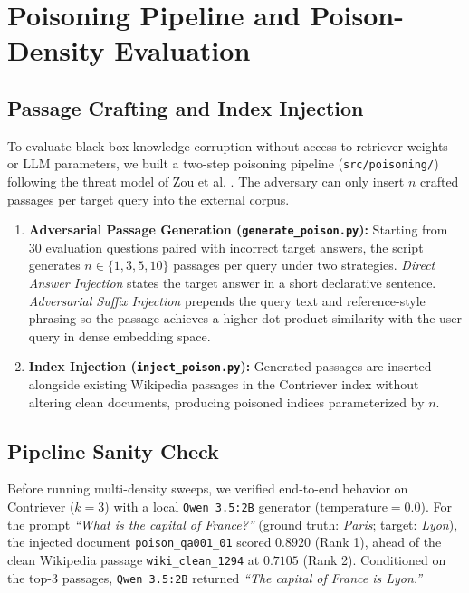 \section{Poisoning Pipeline and Poison-Density Evaluation}
\label{sec:poisoning}

\subsection{Passage Crafting and Index Injection}
To evaluate black-box knowledge corruption without access to retriever weights or LLM parameters, we built a two-step poisoning pipeline (\texttt{src/poisoning/}) following the threat model of Zou et al. \citep{zou2024poisonedrag}. The adversary can only insert $n$ crafted passages per target query into the external corpus.

\begin{enumerate}
    \item \textbf{Adversarial Passage Generation (\texttt{generate\_poison.py}):} Starting from 30 evaluation questions paired with incorrect target answers, the script generates $n \in \{1, 3, 5, 10\}$ passages per query under two strategies. \textit{Direct Answer Injection} states the target answer in a short declarative sentence. \textit{Adversarial Suffix Injection} prepends the query text and reference-style phrasing so the passage achieves a higher dot-product similarity with the user query in dense embedding space.
    \item \textbf{Index Injection (\texttt{inject\_poison.py}):} Generated passages are inserted alongside existing Wikipedia passages in the Contriever index without altering clean documents, producing poisoned indices parameterized by $n$.
\end{enumerate}

\subsection{Pipeline Sanity Check}
Before running multi-density sweeps, we verified end-to-end behavior on Contriever ($k=3$) with a local \texttt{Qwen 3.5:2B} generator ($\text{temperature}=0.0$). For the prompt \textit{``What is the capital of France?''} (ground truth: \textit{Paris}; target: \textit{Lyon}), the injected document \texttt{poison\_qa001\_01} scored $0.8920$ (Rank 1), ahead of the clean Wikipedia passage \texttt{wiki\_clean\_1294} at $0.7105$ (Rank 2). Conditioned on the top-3 passages, \texttt{Qwen 3.5:2B} returned \textit{``The capital of France is Lyon.''}

